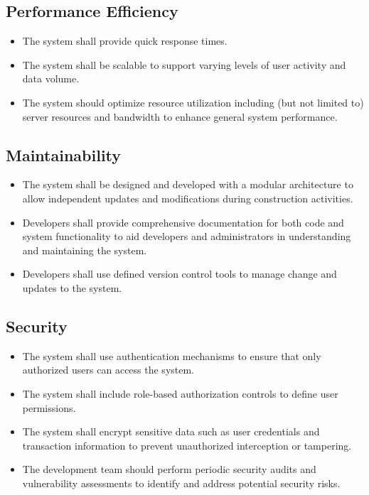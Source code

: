 \documentclass[letterpaper,12pt,oneside,listof=totoc]{scrreprt}
\begin{document}
\subsection{Performance Efficiency}
\begin{itemize}
    \item The system shall provide quick response times.
    \item The system shall be scalable to support varying levels of user activity and data volume.
    \item The system should optimize resource utilization including (but not limited to) server resources and bandwidth to enhance general system performance.
\end{itemize}

\subsection{Maintainability}
\begin{itemize}
    \item The system shall be designed and developed with a modular architecture to allow independent updates and modifications during construction activities.
    \item Developers shall provide comprehensive documentation for both code and system functionality to aid developers and administrators in understanding and maintaining the system.
    \item Developers shall use defined version control tools to manage change and updates to the system.
\end{itemize}

\subsection{Security}
\begin{itemize}
    \item The system shall use authentication mechanisms to ensure that only authorized users can access the system.
    \item The system shall include role-based authorization controls to define user permissions.
    \item The system shall encrypt sensitive data such as user credentials and transaction information to prevent unauthorized interception or tampering.
    \item The development team should perform periodic security audits and vulnerability assessments to identify and address potential security risks.
\end{itemize}
\end{document}
